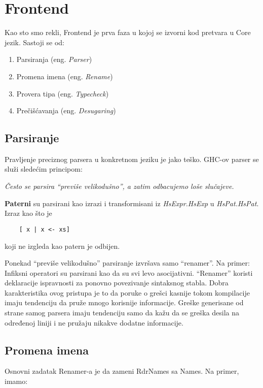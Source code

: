 \section{Frontend}
\label{sec:frontend}

Kao sto smo rekli, Frontend je prva faza u kojoj se izvorni kod pretvara u Core jezik. Sastoji se od:
	 \begin{enumerate}
	 	\item Parsiranja (eng. \emph{Parser})
	 	\item Promena imena (eng. \emph{Rename}) 
	 	\item Provera tipa (eng. \emph{Typecheck})
	 	\item Prečišćavanja (eng. \emph{Desugaring})
	 \end{enumerate}


\subsection{Parsiranje}
\label{subsec:podnaslovParse}

Pravljenje preciznog parsera u konkretnom jeziku je jako teško. GHC-ov parser se služi sledećim principom: 

\textit{Često se parsira “previše velikodušno”,  a zatim odbacujemo loše slučajeve.}

\textbf{Paterni} su parsirani kao izrazi i transformisani iz 
\textit{HsExpr.HsExp} u\textit{ HsPat.HsPat}. Izraz kao što je
\begin{verbatim}
	[ x | x <- xs]
\end{verbatim}  
koji ne izgleda kao patern je odbijen.

Ponekad “previše velikodušno” parsiranje izvršava samo “renamer”. Na primer:
Infiksni operatori  su parsirani kao da su svi levo asocijativni. “Renamer” koristi deklaracije ispravnosti za ponovno povezivanje sintaksnog stabla. Dobra karakteristika ovog pristupa je to da poruke o grešci kasnije  tokom kompilacije imaju tendenciju da pruže mnogo korisnije informacije. Greške generisane od strane samog parsera imaju tendenciju samo da kažu da se greška desila na određenoj liniji i ne pružaju nikakve dodatne informacije.

\subsection{Promena imena}
\label{subsec:podnaslovRename}

Osnovni zadatak Renamer-a je da zameni RdrNames sa Names. Na primer, imamo:

